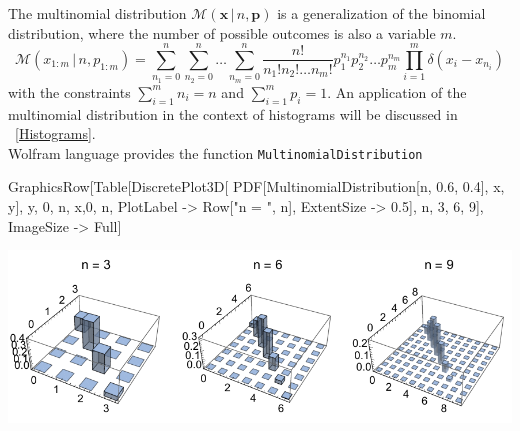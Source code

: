 \documentclass{tstextbook}
\begin{document}
\begin{example}
The multinomial distribution $ \mathcal{M}(\mathbf{x}\,\vert\, n,\mathbf{p})$ is a generalization of the binomial distribution, where the number of possible outcomes is also a variable $m$.  
  \begin{equation}
    \mathcal{M}(x_{1:m}\,\vert\, n,p_{1:m})=\sum_{n_1=0}^n\sum_{n_2=0}^n\ldots \sum_{n_m=0}^n \frac{n!}{n_1!n_2!\ldots n_m!}p_1^{n_1}p_2^{n_2}\ldots p_m^{n_m}\prod_{i=1}^m\delta(x_i-x_{n_i})
  \end{equation}
with the constraints $\sum_{i=1}^{m}n_i=n$ and $\sum_{i=1}^{m}p_i=1$. An application of the multinomial distribution in the context of histograms will be discussed in ~\ref{Histograms}.\\

Wolfram language provides the function \texttt{MultinomialDistribution}

\begin{mathematica}
GraphicsRow[Table[DiscretePlot3D[
   PDF[MultinomialDistribution[n, {0.6, 0.4}], {x, y}],
   {y, 0, n}, {x,0, n}, PlotLabel -> Row[{"n = ", n}], 
   ExtentSize -> 0.5], {n, {3, 6, 9}}], ImageSize -> Full]
\end{mathematica}
\includegraphics[scale=0.9, center]{images/multinomial_distribution.pdf}  
\end{example}
\end{document}
